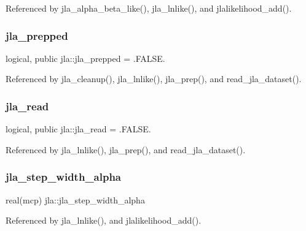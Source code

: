 Referenced by jla\+\_\+alpha\+\_\+beta\+\_\+like(), jla\+\_\+lnlike(), and jlalikelihood\+\_\+add().

\mbox{\label{namespacejla_a8a48484fda3925329cb345d9b671b56b}} 
\subsubsection{\texorpdfstring{jla\+\_\+prepped}{jla\_prepped}}
{\footnotesize\ttfamily logical, public jla\+::jla\+\_\+prepped = .F\+A\+L\+S\+E.}



Referenced by jla\+\_\+cleanup(), jla\+\_\+lnlike(), jla\+\_\+prep(), and read\+\_\+jla\+\_\+dataset().

\mbox{\label{namespacejla_a408c4f01bb785e06e2a2555aa770e090}} 
\subsubsection{\texorpdfstring{jla\+\_\+read}{jla\_read}}
{\footnotesize\ttfamily logical, public jla\+::jla\+\_\+read = .F\+A\+L\+S\+E.}



Referenced by jla\+\_\+lnlike(), jla\+\_\+prep(), and read\+\_\+jla\+\_\+dataset().

\mbox{\label{namespacejla_a1b8ab5c356e2c83f267f757196a4a1d2}} 
\subsubsection{\texorpdfstring{jla\+\_\+step\+\_\+width\+\_\+alpha}{jla\_step\_width\_alpha}}
{\footnotesize\ttfamily real(mcp) jla\+::jla\+\_\+step\+\_\+width\+\_\+alpha}



Referenced by jla\+\_\+lnlike(), and jlalikelihood\+\_\+add().

\mbox{\label{namespacejla_adbfc26690b5ccc65be262cc876cb3bc0}} 
